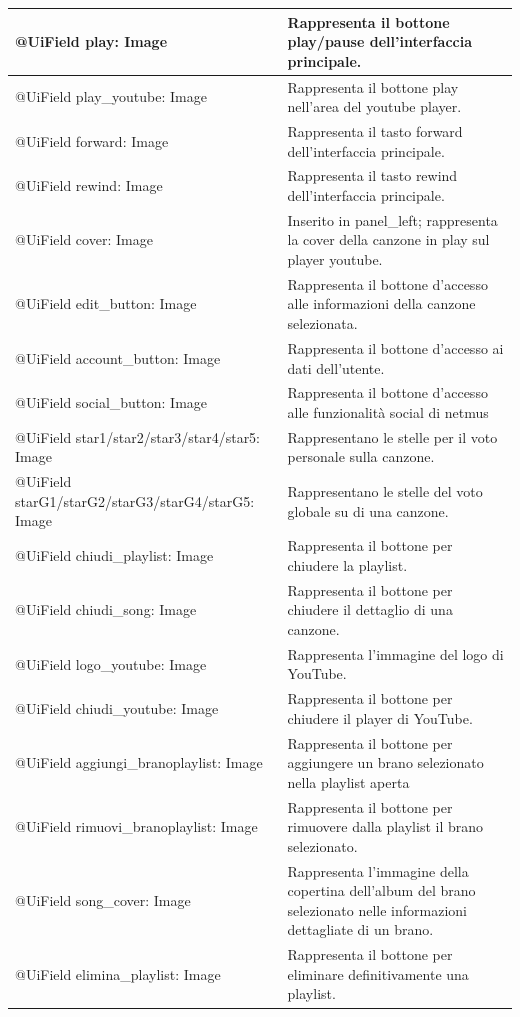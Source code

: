 \begin{longtable}{|p{}|p{}|}
@UiField play: Image & Rappresenta il bottone play/pause
dell'interfaccia principale.\\\hline
@UiField play\_youtube: Image & Rappresenta il bottone play nell'area del
youtube player.\\\hline
@UiField forward: Image & Rappresenta il tasto forward dell'interfaccia
principale.\\\hline
@UiField rewind: Image & Rappresenta il tasto rewind dell'interfaccia
principale.\\\hline
@UiField cover: Image & Inserito in panel\_left; rappresenta la cover della
canzone in play sul player youtube.\\\hline
@UiField edit\_button: Image & Rappresenta il bottone d'accesso alle
informazioni della canzone selezionata.\\\hline
@UiField account\_button: Image & Rappresenta il bottone d'accesso ai
dati dell'utente.\\\hline
@UiField social\_button: Image & Rappresenta il bottone d'accesso alle
funzionalit\`a social di netmus\\\hline
@UiField star1/star2/star3/star4/star5: Image & Rappresentano le stelle
per il voto personale sulla canzone.\\\hline
@UiField starG1/starG2/starG3/starG4/starG5: Image & Rappresentano le
stelle del voto globale su di una canzone.\\\hline
@UiField chiudi\_playlist: Image & Rappresenta il bottone per chiudere la
playlist.\\\hline @UiField chiudi\_song: Image & Rappresenta il bottone
per chiudere il dettaglio di una canzone.\\\hline
@UiField logo\_youtube: Image & Rappresenta l'immagine del logo di
YouTube.\\\hline
@UiField chiudi\_youtube: Image & Rappresenta il bottone per chiudere il
player di YouTube.\\\hline
@UiField aggiungi\_branoplaylist: Image & Rappresenta il bottone per
aggiungere un brano selezionato nella playlist aperta\\\hline
@UiField rimuovi\_branoplaylist: Image & Rappresenta il bottone per
rimuovere dalla playlist il brano selezionato.\\\hline
@UiField song\_cover: Image & Rappresenta l'immagine della copertina
dell'album del brano selezionato nelle informazioni dettagliate di un
brano.\\\hline
@UiField elimina\_playlist: Image & Rappresenta il bottone per eliminare
definitivamente una playlist.\\\hline

\end{longtable}

